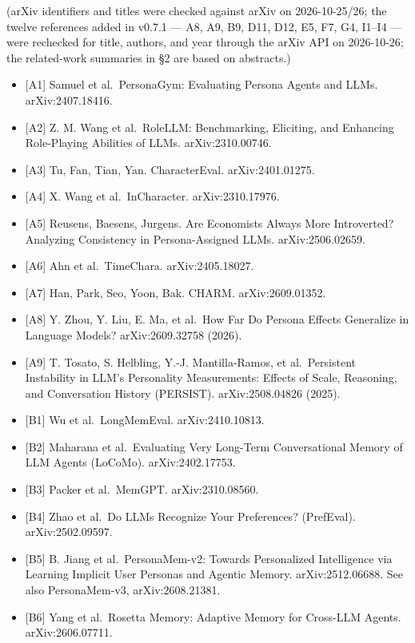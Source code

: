 \documentclass[10pt]{article}
\providecommand{\tightlist}{\setlength{\itemsep}{0pt}\setlength{\parskip}{0pt}}
\begin{document}
(arXiv identifiers and titles were checked against arXiv on 2026-10-25/26; the twelve references added in v0.7.1 --- A8, A9, B9, D11, D12, E5, F7, G4, I1--I4 --- were rechecked for title, authors, and year through the arXiv API on 2026-10-26; the related-work summaries in §2 are based on abstracts.)

\begin{itemize}
\tightlist
\item
  {[}A1{]} Samuel et al.~PersonaGym: Evaluating Persona Agents and LLMs. arXiv:2407.18416.
\item
  {[}A2{]} Z. M. Wang et al.~RoleLLM: Benchmarking, Eliciting, and Enhancing Role-Playing Abilities of LLMs. arXiv:2310.00746.
\item
  {[}A3{]} Tu, Fan, Tian, Yan. CharacterEval. arXiv:2401.01275.
\item
  {[}A4{]} X. Wang et al.~InCharacter. arXiv:2310.17976.
\item
  {[}A5{]} Reusens, Baesens, Jurgens. Are Economists Always More Introverted? Analyzing Consistency in Persona-Assigned LLMs. arXiv:2506.02659.
\item
  {[}A6{]} Ahn et al.~TimeChara. arXiv:2405.18027.
\item
  {[}A7{]} Han, Park, Seo, Yoon, Bak. CHARM. arXiv:2609.01352.
\item
  {[}A8{]} Y. Zhou, Y. Liu, E. Ma, et al.~How Far Do Persona Effects Generalize in Language Models? arXiv:2609.32758 (2026).
\item
  {[}A9{]} T. Tosato, S. Helbling, Y.-J. Mantilla-Ramos, et al.~Persistent Instability in LLM's Personality Measurements: Effects of Scale, Reasoning, and Conversation History (PERSIST). arXiv:2508.04826 (2025).
\item
  {[}B1{]} Wu et al.~LongMemEval. arXiv:2410.10813.
\item
  {[}B2{]} Maharana et al.~Evaluating Very Long-Term Conversational Memory of LLM Agents (LoCoMo). arXiv:2402.17753.
\item
  {[}B3{]} Packer et al.~MemGPT. arXiv:2310.08560.
\item
  {[}B4{]} Zhao et al.~Do LLMs Recognize Your Preferences? (PrefEval). arXiv:2502.09597.
\item
  {[}B5{]} B. Jiang et al.~PersonaMem-v2: Towards Personalized Intelligence via Learning Implicit User Personas and Agentic Memory. arXiv:2512.06688. See also PersonaMem-v3, arXiv:2608.21381.
\item
  {[}B6{]} Yang et al.~Rosetta Memory: Adaptive Memory for Cross-LLM Agents. arXiv:2606.07711.

\end{itemize}
\end{document}
